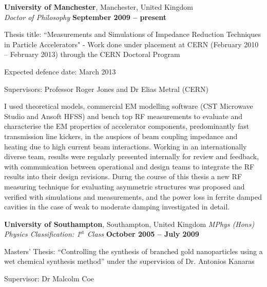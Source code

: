 \documentclass[margin,line]{resume}
\begin{document}
\begin{resume}
    \textbf{University of Manchester}, Manchester, United Kingdom \vspace{2mm}\\\vspace{1mm}%
    \textsl{Doctor of Philosophy} \hfill \textbf{ September 2009 -- present}\vspace{-3mm}\\\vspace{-1mm}%
    \begin{list2}
        \item Thesis title: ``Measurements and Simulations of Impedance Reduction Techniques in Particle Accelerators" - Work done under placement at CERN (February 2010 -- February 2013) through the CERN Doctoral Program
        \item Expected defence date: March 2013
        \item Supervisors:  Professor Roger Jones and Dr Elias Metral (CERN)
        \item I used theoretical models, commercial EM modelling software (CST Microwave Studio and Ansoft HFSS) and bench top RF measurements to evaluate and characterise the EM properties of accelerator components, predominantly fast transmission line kickers, in the auspices of beam coupling impedance and heating due to high current beam interactions. Working in an internationally diverse team, results were regularly presented internally for review and feedback, with communication between operational and design teams to integrate the RF results into their design revisions. Durng the course of this thesis a new RF measuring technique for evaluating asymmetric structures was proposed and verified with simulations and measurements, and the power loss in ferrite damped cavities in the case of weak to moderate damping investigated in detail.
    \end{list2}\vspace{-1.5mm}
    \textbf{ University of Southampton}, Southampton, United Kingdom 
    \textsl{MPhys (Hons) Physics Classification: 1$^{\mathrm{st}}$ Class} \hfill \textbf{October 2005 -- July 2009}\vspace{-3mm}\\\vspace{-1mm}%
    \begin{list2}
        \item Masters' Thesis: ``Controlling the synthesis of branched gold nanoparticles using a wet chemical synthesis method'' under the supervision of Dr. Antonios Kanaras
        \item Supervisor: Dr Malcolm Coe
    \end{list2}\vspace{-1.5mm}


\end{resume}
\end{document}
